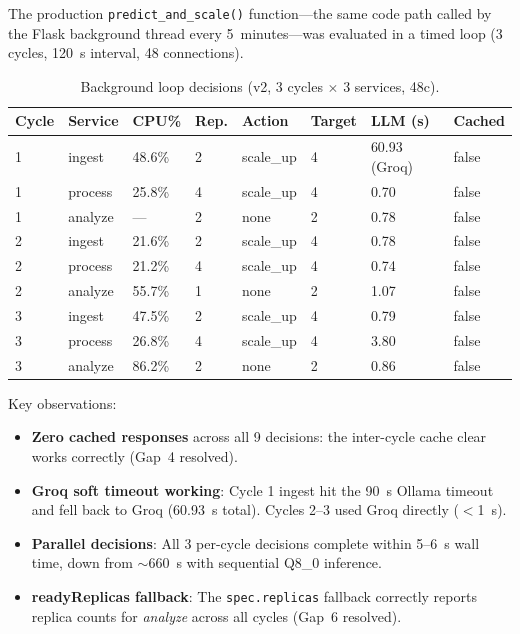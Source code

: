 The production \texttt{predict\_and\_scale()} function—the same code path called
by the Flask background thread every 5~minutes—was evaluated in a timed loop
(3 cycles, 120~s interval, 48 connections).

\begin{table}[h]
  \centering
  \caption{Background loop decisions (v2, 3 cycles $\times$ 3 services, 48c).}
  \label{tab:bg-loop}
  \small
  \begin{tabular}{llllllll}
    \toprule
    Cycle & Service & CPU\% & Rep. & Action & Target & LLM (s) & Cached \\
    \midrule
    1 & ingest  & 48.6\% & 2 & scale\_up & 4 & 60.93 (Groq) & false \\
    1 & process & 25.8\% & 4 & scale\_up & 4 & 0.70          & false \\
    1 & analyze & ---    & 2 & none      & 2 & 0.78          & false \\
    2 & ingest  & 21.6\% & 2 & scale\_up & 4 & 0.78          & false \\
    2 & process & 21.2\% & 4 & scale\_up & 4 & 0.74          & false \\
    2 & analyze & 55.7\% & 1 & none      & 2 & 1.07          & false \\
    3 & ingest  & 47.5\% & 2 & scale\_up & 4 & 0.79          & false \\
    3 & process & 26.8\% & 4 & scale\_up & 4 & 3.80          & false \\
    3 & analyze & 86.2\% & 2 & none      & 2 & 0.86          & false \\
    \bottomrule
  \end{tabular}
\end{table}

Key observations:
\begin{itemize}
  \item \textbf{Zero cached responses} across all 9 decisions: the inter-cycle
  cache clear works correctly (Gap~4 resolved).
  \item \textbf{Groq soft timeout working}: Cycle 1 ingest hit the 90~s Ollama
  timeout and fell back to Groq (60.93~s total). Cycles 2--3 used Groq directly
  ($<$1~s).
  \item \textbf{Parallel decisions}: All 3 per-cycle decisions complete within
  5--6~s wall time, down from $\sim$660~s with sequential Q8\_0 inference.
  \item \textbf{readyReplicas fallback}: The \texttt{spec.replicas} fallback
  correctly reports replica counts for \textit{analyze} across all cycles
  (Gap~6 resolved).
\end{itemize}

